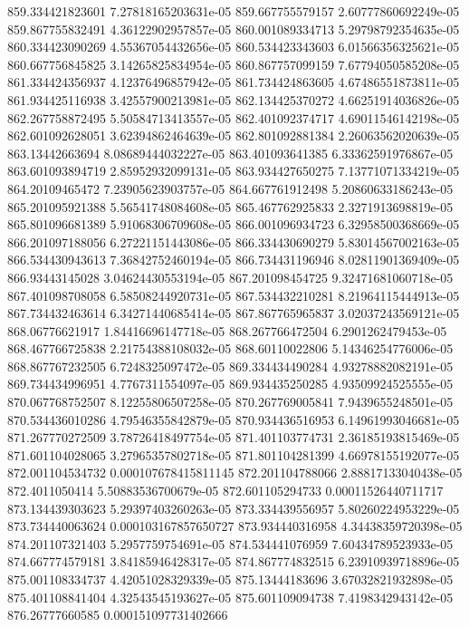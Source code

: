 {859.334421823601 7.27818165203631e-05
859.667755579157 2.60777860692249e-05
859.867755832491 4.36122902957857e-05
860.001089334713 5.29798792354635e-05
860.334423090269 4.55367054432656e-05
860.534423343603 6.01566356325621e-05
860.667756845825 3.14265825834954e-05
860.867757099159 7.67794050585208e-05
861.334424356937 4.12376496857942e-05
861.734424863605 4.67486551873811e-05
861.934425116938 3.42557900213981e-05
862.134425370272 4.66251914036826e-05
862.267758872495 5.50584713413557e-05
862.401092374717 4.69011546142198e-05
862.601092628051 3.62394862464639e-05
862.801092881384 2.26063562020639e-05
863.13442663694 8.08689444032227e-05
863.401093641385 6.33362591976867e-05
863.601093894719 2.85952932099131e-05
863.934427650275 7.13771071334219e-05
864.20109465472 7.23905623903757e-05
864.667761912498 5.20860633186243e-05
865.201095921388 5.56541748084608e-05
865.467762925833 2.3271913698819e-05
865.801096681389 5.91068306709608e-05
866.001096934723 6.32958500368669e-05
866.201097188056 6.27221151443086e-05
866.334430690279 5.83014567002163e-05
866.534430943613 7.36842752460194e-05
866.734431196946 8.02811901369409e-05
866.93443145028 3.04624430553194e-05
867.201098454725 9.32471681060718e-05
867.401098708058 6.58508244920731e-05
867.534432210281 8.21964115444913e-05
867.734432463614 6.34271440685414e-05
867.867765965837 3.02037243569121e-05
868.06776621917 1.84416696147718e-05
868.267766472504 6.2901262479453e-05
868.467766725838 2.21754388108032e-05
868.60110022806 5.14346254776006e-05
868.867767232505 6.7248325097472e-05
869.334434490284 4.93278882082191e-05
869.734434996951 4.7767311554097e-05
869.934435250285 4.93509924525555e-05
870.067768752507 8.12255806507258e-05
870.267769005841 7.9439655248501e-05
870.534436010286 4.79546355842879e-05
870.934436516953 6.14961993046681e-05
871.267770272509 3.78726418497754e-05
871.401103774731 2.36185193815469e-05
871.601104028065 3.27965357802718e-05
871.801104281399 4.66978155192077e-05
872.001104534732 0.000107678415811145
872.201104788066 2.88817133040438e-05
872.4011050414 5.50883536700679e-05
872.601105294733 0.00011526440711717
873.134439303623 5.29397403260263e-05
873.334439556957 5.80260224953229e-05
873.734440063624 0.000103167857650727
873.934440316958 4.34438359720398e-05
874.201107321403 5.2957759754691e-05
874.534441076959 7.60434789523933e-05
874.667774579181 3.84185946428317e-05
874.867774832515 6.23910939718896e-05
875.001108334737 4.42051028329339e-05
875.13444183696 3.67032821932898e-05
875.401108841404 4.32543545193627e-05
875.601109094738 7.4198342943142e-05
876.26777660585 0.000151097731402666
}
